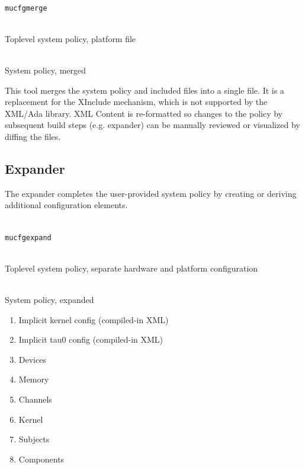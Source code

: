 \documentclass[a4paper,twoside,titlepage]{article}
\begin{document}
\begin{description} \itemsep1pt \parskip0pt
	\item[Name] \hfill \\
		\texttt{mucfgmerge}
	\item[Input] \hfill \\
		Toplevel system policy, platform file
	\item[Output] \hfill \\
		System policy, merged
\end{description}

This tool merges the system policy and included files into a single file. It is
a replacement for the XInclude mechanism, which is not supported by the XML/Ada
library. XML Content is re-formatted so changes to the policy by subsequent
build steps (e.g. expander) can be manually reviewed or visualized by diffing
the files.

\subsection{Expander}
\label{sec:tools-expander}
The expander completes the user-provided system policy by creating or deriving
additional configuration elements.

\begin{description} \itemsep1pt \parskip0pt
	\item[Name] \hfill \\
		\texttt{mucfgexpand}
	\item[Input] \hfill \\
		Toplevel system policy, separate hardware and platform configuration
	\item[Output] \hfill \\
		System policy, expanded
	\item[Data] \hfill
		\begin{enumerate}
			\item Implicit kernel config (compiled-in XML)
			\item Implicit tau0 config (compiled-in XML)
			\item Devices
			\item Memory
			\item Channels
			\item Kernel
			\item Subjects
			\item Components
		\end{enumerate}
\end{description}
\end{document}

